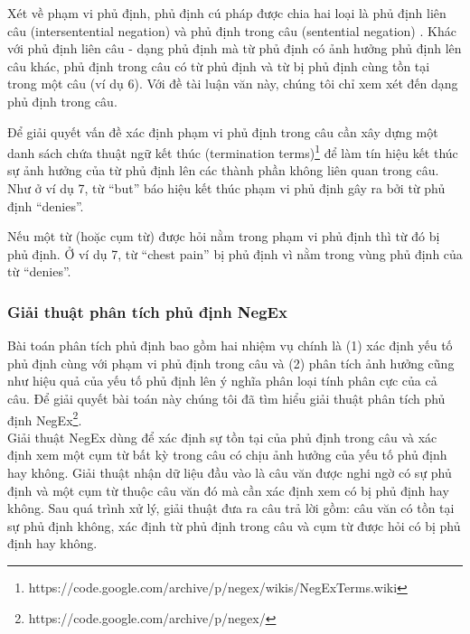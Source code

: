 Xét về phạm vi phủ định, phủ định cú pháp được chia hai loại là phủ định liên câu (intersentential negation) và phủ định trong câu (sentential negation) \cite{Councill2010}. Khác với phủ định liên câu - dạng phủ định mà từ phủ định có ảnh hưởng phủ định lên câu khác, phủ định trong câu có từ phủ định và từ bị phủ định cùng tồn tại trong một câu (ví dụ 6). Với đề tài luận văn này, chúng tôi chỉ xem xét đến dạng phủ định trong câu.


Để giải quyết vấn đề xác định phạm vi phủ định trong câu cần xây dựng một danh sách chứa thuật ngữ kết thúc (termination terms)\footnote{https://code.google.com/archive/p/negex/wikis/NegExTerms.wiki} để làm tín hiệu kết thúc sự ảnh hưởng của từ phủ định lên các thành phần không liên quan trong câu. Như ở ví dụ 7, từ ``but'' báo hiệu kết thúc phạm vi phủ định gây ra bởi từ phủ định ``denies''.


Nếu một từ (hoặc cụm từ) được hỏi nằm trong phạm vi phủ định thì từ đó bị phủ định. Ở ví dụ 7, từ ``chest pain'' bị phủ định vì nằm trong vùng phủ định của từ ``denies''.

\subsubsection*{Giải thuật phân tích phủ định NegEx}
Bài toán phân tích phủ định bao gồm hai nhiệm vụ chính là (1) xác định yếu tố phủ định cùng với phạm vi phủ định trong câu và (2) phân tích ảnh hưởng cũng như hiệu quả của yếu tố phủ định lên ý nghĩa phân loại tính phân cực của cả câu. Để giải quyết bài toán này chúng tôi đã tìm hiểu giải thuật phân tích phủ định NegEx\footnote{https://code.google.com/archive/p/negex/}. \\

Giải thuật NegEx dùng để xác định sự tồn tại của phủ định trong câu và xác định xem một cụm từ bất kỳ trong câu có chịu ảnh hưởng của yếu tố phủ định hay không. Giải thuật nhận dữ liệu đầu vào là câu văn được nghi ngờ có sự phủ định và một cụm từ thuộc câu văn đó mà cần xác định xem có bị phủ định hay không. Sau quá trình xử lý, giải thuật đưa ra câu trả lời gồm: câu văn có tồn tại sự phủ định không, xác định từ phủ định trong câu và cụm từ được hỏi có bị phủ định hay không.\\ 

